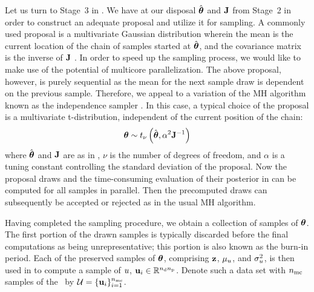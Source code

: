 Let us turn to Stage~3 in .
We have at our disposal $\hat{{\boldsymbol\theta}}$ and $\mathbf{J}$ from Stage~2 in order to construct an adequate proposal and utilize it for sampling.
A commonly used proposal is a multivariate Gaussian distribution wherein the mean is the current location of the chain of samples started at $\hat{{\boldsymbol\theta}}$, and the covariance matrix is the inverse of $\mathbf{J}$ \cite{gelman2004, bernardo2007}.
In order to speed up the sampling process, we would like to make use of the potential of multicore parallelization.
The above proposal, however, is purely sequential as the mean for the next sample draw is dependent on the previous sample.
Therefore, we appeal to a variation of the MH algorithm known as the independence sampler \cite{gelman2004}.
In this case, a typical choice of the proposal is a multivariate t-distribution, independent of the current position of the chain:
\begin{equation} \elabel{proposal}
  \vparam \sim \studentst{\nu}{\hat{\vparam}}{\alpha^2 \mOI^{-1}}
\end{equation}
where $\hat{{\boldsymbol\theta}}$ and $\mathbf{J}$ are as in , $\nu$ is the number of degrees of freedom, and $\alpha$ is a tuning constant controlling the standard deviation of the proposal.
Now the proposal draws and the time-consuming evaluation of their posterior in  can be computed for all samples in parallel.
Then the precomputed draws can subsequently be accepted or rejected as in the usual MH algorithm.

Having completed the sampling procedure, we obtain a collection of samples of ${\boldsymbol\theta}$. The first portion of the drawn samples is typically discarded before the final computations as being unrepresentative; this portion is also known as the burn-in period.
Each of the preserved samples of ${\boldsymbol\theta}$, comprising $\mathbf{z}$, $\mu_u$, and $\sigma^2_u$, is then used in  to compute a sample of $u$, $\mathbf{u}_i \in \mathbb{R}^{{n_\text{d}} {n_\text{p}}}$.
Denote such a data set with ${n_\text{mc}}$ samples of the \qoi\ by $\mathcal{U} = \{ \mathbf{u}_i \}_{i = 1}^{n_\text{mc}}$.

